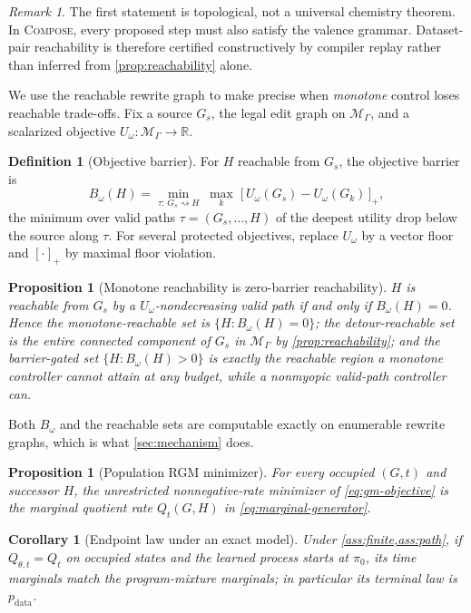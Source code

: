 \documentclass{article}
\newcommand{\method}{\textsc{Compose}\xspace}
\newcommand{\M}{\mathcal{M}_{\Gamma}}
\newcommand{\pdata}{p_{\mathrm{data}}}
\newcommand{\pzero}{\pi_0}
\newcommand{\R}{\mathbb{R}}
\newtheorem{proposition}[theorem]{Proposition}
\newtheorem{corollary}[theorem]{Corollary}
\theoremstyle{definition}
\newtheorem{definition}[theorem]{Definition}
\theoremstyle{remark}
\newtheorem{remark}[theorem]{Remark}
\begin{document}
\begin{remark}
The first statement is topological, not a universal chemistry theorem. In \method, every proposed step must also satisfy the valence grammar. Dataset-pair reachability is therefore certified constructively by compiler replay rather than inferred from \cref{prop:reachability} alone.
\end{remark}

We use the reachable rewrite graph to make precise when \emph{monotone} control loses reachable trade-offs. Fix a source $G_s$, the legal edit graph on $\M$, and a scalarized objective $U_\omega:\M\to\R$.
\begin{definition}[Objective barrier]\label{def:barrier}
For $H$ reachable from $G_s$, the objective barrier is
\begin{equation}
B_\omega(H)=\min_{\tau:\,G_s\rightsquigarrow H}\;\max_{k}\;\big[\,U_\omega(G_s)-U_\omega(G_k)\,\big]_+,
\label{eq:barrier}
\end{equation}
the minimum over valid paths $\tau=(G_s,\ldots,H)$ of the deepest utility drop below the source along $\tau$. For several protected objectives, replace $U_\omega$ by a vector floor and $[\cdot]_+$ by maximal floor violation.
\end{definition}
\begin{proposition}[Monotone reachability is zero-barrier reachability]\label{prop:barrier}
$H$ is reachable from $G_s$ by a $U_\omega$-nondecreasing valid path if and only if $B_\omega(H)=0$. Hence the monotone-reachable set is $\{H:B_\omega(H)=0\}$; the detour-reachable set is the entire connected component of $G_s$ in $\M$ by \cref{prop:reachability}; and the barrier-gated set $\{H:B_\omega(H)>0\}$ is exactly the reachable region a monotone controller cannot attain at any budget, while a nonmyopic valid-path controller can.
\end{proposition}
Both $B_\omega$ and the reachable sets are computable exactly on enumerable rewrite graphs, which is what \cref{sec:mechanism} does.

\begin{proposition}[Population RGM minimizer]\label{prop:gm}
For every occupied $(G,t)$ and successor $H$, the unrestricted nonnegative-rate minimizer of \eqref{eq:gm-objective} is the marginal quotient rate $Q_t(G,H)$ in \eqref{eq:marginal-generator}.
\end{proposition}

\begin{corollary}[Endpoint law under an exact model]\label{cor:endpoint}
Under \cref{ass:finite,ass:path}, if $Q_{\theta,t}=Q_t$ on occupied states and the learned process starts at $\pzero$, its time marginals match the program-mixture marginals; in particular its terminal law is $\pdata$.
\end{corollary}
\end{document}
